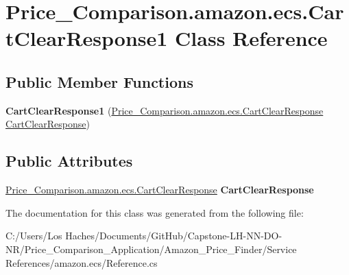 \hypertarget{class_price___comparison_1_1amazon_1_1ecs_1_1_cart_clear_response1}{\section{Price\-\_\-\-Comparison.\-amazon.\-ecs.\-Cart\-Clear\-Response1 Class Reference}
\label{class_price___comparison_1_1amazon_1_1ecs_1_1_cart_clear_response1}
}
\subsection*{Public Member Functions}
\begin{DoxyCompactItemize}
\item 
\hypertarget{class_price___comparison_1_1amazon_1_1ecs_1_1_cart_clear_response1_ada7903dd0a347474573dca39aa4ebbdf}{{\bfseries Cart\-Clear\-Response1} (\hyperlink{class_price___comparison_1_1amazon_1_1ecs_1_1_cart_clear_response}{Price\-\_\-\-Comparison.\-amazon.\-ecs.\-Cart\-Clear\-Response} \hyperlink{class_price___comparison_1_1amazon_1_1ecs_1_1_cart_clear_response}{Cart\-Clear\-Response})}\label{class_price___comparison_1_1amazon_1_1ecs_1_1_cart_clear_response1_ada7903dd0a347474573dca39aa4ebbdf}

\end{DoxyCompactItemize}
\subsection*{Public Attributes}
\begin{DoxyCompactItemize}
\item 
\hypertarget{class_price___comparison_1_1amazon_1_1ecs_1_1_cart_clear_response1_ac0358798646eaa15e4af86b73e728268}{\hyperlink{class_price___comparison_1_1amazon_1_1ecs_1_1_cart_clear_response}{Price\-\_\-\-Comparison.\-amazon.\-ecs.\-Cart\-Clear\-Response} {\bfseries Cart\-Clear\-Response}}\label{class_price___comparison_1_1amazon_1_1ecs_1_1_cart_clear_response1_ac0358798646eaa15e4af86b73e728268}

\end{DoxyCompactItemize}


The documentation for this class was generated from the following file\-:\begin{DoxyCompactItemize}
\item 
C\-:/\-Users/\-Los Haches/\-Documents/\-Git\-Hub/\-Capstone-\/\-L\-H-\/\-N\-N-\/\-D\-O-\/\-N\-R/\-Price\-\_\-\-Comparison\-\_\-\-Application/\-Amazon\-\_\-\-Price\-\_\-\-Finder/\-Service References/amazon.\-ecs/Reference.\-cs\end{DoxyCompactItemize}
